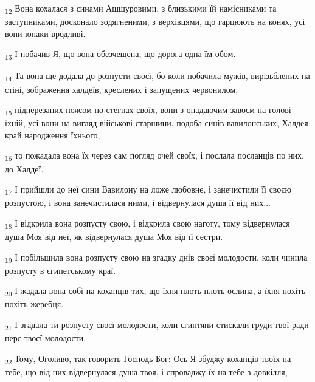 \begin{tcolorbox}
\textsubscript{12} Вона кохалася з синами Ашшуровими, з близькими їй намісниками та заступниками, досконало зодягненими, з верхівцями, що гарцюють на конях, усі вони юнаки вродливі.
\end{tcolorbox}
\begin{tcolorbox}
\textsubscript{13} І побачив Я, що вона обезчещена, що дорога одна їм обом.
\end{tcolorbox}
\begin{tcolorbox}
\textsubscript{14} Та вона ще додала до розпусти своєї, бо коли побачила мужів, вирізьблених на стіні, зображення халдеїв, креслених і запущених червонилом,
\end{tcolorbox}
\begin{tcolorbox}
\textsubscript{15} підперезаних поясом по стегнах своїх, вони з опадаючим завоєм на голові їхній, усі вони на вигляд військові старшини, подоба синів вавилонських, Халдея край народження їхнього,
\end{tcolorbox}
\begin{tcolorbox}
\textsubscript{16} то пожадала вона їх через сам погляд очей своїх, і послала посланців по них, до Халдеї.
\end{tcolorbox}
\begin{tcolorbox}
\textsubscript{17} І прийшли до неї сини Вавилону на ложе любовне, і занечистили її своєю розпустою, і вона занечистилася ними, і відвернулася душа її від них...
\end{tcolorbox}
\begin{tcolorbox}
\textsubscript{18} І відкрила вона розпусту свою, і відкрила свою наготу, тому відвернулася душа Моя від неї, як відвернулася душа Моя від її сестри.
\end{tcolorbox}
\begin{tcolorbox}
\textsubscript{19} І побільшила вона розпусту свою на згадку днів своєї молодости, коли чинила розпусту в єгипетському краї.
\end{tcolorbox}
\begin{tcolorbox}
\textsubscript{20} І жадала вона собі на коханців тих, що їхня плоть плоть ослина, а їхня похіть похіть жеребця.
\end{tcolorbox}
\begin{tcolorbox}
\textsubscript{21} І згадала ти розпусту своєї молодости, коли єгиптяни стискали груди твої ради перс твоєї молодости.
\end{tcolorbox}
\begin{tcolorbox}
\textsubscript{22} Тому, Оголиво, так говорить Господь Бог: Ось Я збуджу коханців твоїх на тебе, що від них відвернулася душа твоя, і спроваджу їх на тебе з довкілля,
\end{tcolorbox}
